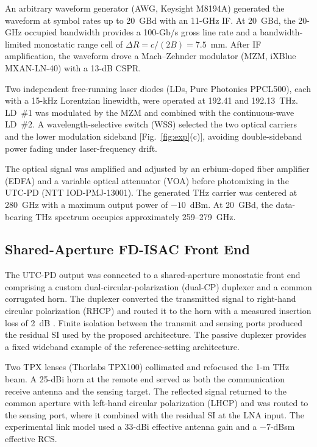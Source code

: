 \documentclass[10pt,journal]{IEEEtran}
\DeclareRobustCommand{\rev}[1]{\textcolor{revisioncolor}{#1}}
\begin{document}
An arbitrary waveform generator (AWG, Keysight M8194A) generated the
waveform at symbol rates up to 20~GBd with an 11-GHz IF. At 20~GBd, the 20-GHz occupied bandwidth provides a
100-Gb/s gross line rate and a bandwidth-limited monostatic range cell
of $\Delta R=c/(2B)=7.5$~mm. After IF amplification, the waveform
drove a Mach--Zehnder modulator (MZM, iXBlue MXAN-LN-40) with a
13-dB CSPR.

Two independent free-running laser diodes
(LDs, Pure Photonics PPCL500), each with a 15-kHz Lorentzian
linewidth, were operated at 192.41 and 192.13~THz. LD~\#1 was
modulated by the MZM and combined with the continuous-wave LD~\#2.
A wavelength-selective switch (WSS) selected the two optical carriers
and the lower modulation sideband [Fig.~\ref{fig:exp}(c)], avoiding
double-sideband power fading under laser-frequency drift.

The optical signal was amplified and adjusted by an erbium-doped
fiber amplifier (EDFA) and a variable optical attenuator (VOA) before
photomixing in the UTC-PD (NTT IOD-PMJ-13001). The generated THz
carrier was centered at 280~GHz with a maximum output power of
$-10$~dBm. At 20~GBd, the data-bearing THz spectrum occupies
approximately 259--279~GHz.

\subsection{Shared-Aperture FD-ISAC Front End}
\label{sec:setup_core}

The UTC-PD output was connected to a shared-aperture monostatic front
end comprising a custom dual-circular-polarization (dual-CP) duplexer
and a common corrugated horn. The duplexer converted the transmitted
signal to right-hand circular polarization (RHCP) and routed it to the
horn with a measured insertion loss of 2~dB
\cite{shu_wideband_2019}. Finite isolation between the transmit and
sensing ports produced the residual SI used by the proposed
architecture. \rev{The passive duplexer provides a fixed wideband example of the
reference-setting architecture.}

Two TPX lenses (Thorlabs TPX100) collimated and refocused the 1-m THz
beam. A 25-dBi horn at the remote end served as both the communication
receive antenna and the sensing target. The reflected signal returned
to the common aperture with left-hand circular polarization (LHCP) and
was routed to the sensing port, where it combined with the residual SI
at the LNA input. The experimental link model used a 33-dBi effective
antenna gain and a $-7$-dBsm effective RCS.
\end{document}
